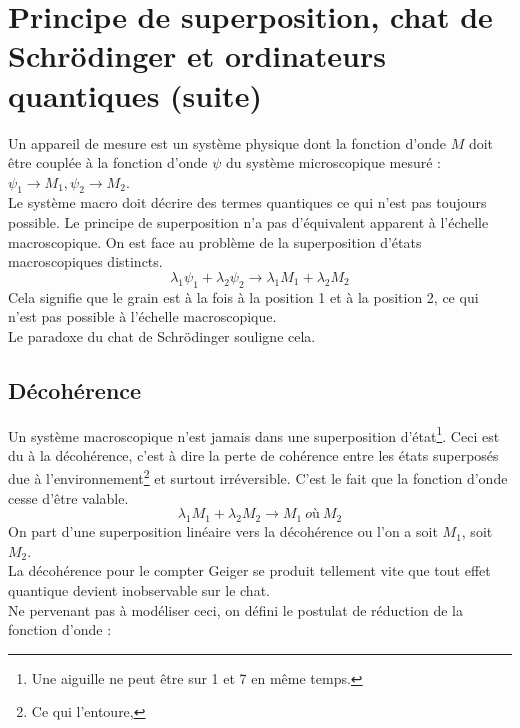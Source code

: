 \documentclass[british,french,11pt, a4paper, openany]{book}
\begin{document}
	\setcounter{section}{6}
	\section{Principe de superposition, chat de Schrödinger et ordinateurs quantiques (suite)}
	Un appareil de mesure est un système physique dont la fonction d'onde $M$ doit être couplée à la fonction d'onde $\psi$ du système microscopique mesuré : $\psi_1 \rightarrow M_1, \psi_2 \rightarrow M_2$.\\
	Le système macro doit décrire des termes quantiques ce qui n'est pas toujours possible. Le principe de superposition n'a pas d'équivalent apparent à l'échelle macroscopique. On est face au problème de la superposition d'états macroscopiques distincts.
	\begin{equation}
		\lambda_1\psi_1 + \lambda_2\psi_2 \rightarrow \lambda_1M_1 + \lambda_2M_2
	\end{equation}
	Cela signifie que le grain est à la fois à la position 1 et à la position 2, ce qui n'est pas possible à l'échelle macroscopique.\\
	Le paradoxe du chat de Schrödinger souligne cela.
	
	\subsection*{Décohérence}
	Un système macroscopique n'est jamais dans une superposition d'état\footnote{Une aiguille ne peut être sur 1 et 7 en même temps.}. Ceci est du à la décohérence, c'est à dire la perte de cohérence entre les états superposés due à l'environnement\footnote{Ce qui l'entoure, } et surtout irréversible. C'est le fait que la fonction d'onde cesse d'être valable.
	\begin{equation}
		\lambda_1M_1 + \lambda_2M_2 \rightarrow M_1\ \textit{où}\ M_2
	\end{equation}
	On part d'une superposition linéaire vers la décohérence ou  l'on a soit $M_1$, soit $M_2$.\\
	La décohérence pour le compter Geiger se produit tellement vite que tout effet quantique devient inobservable sur le chat.\\
	Ne pervenant pas à modéliser ceci, on défini le postulat de réduction de la fonction d'onde :\\
	
\end{document}
